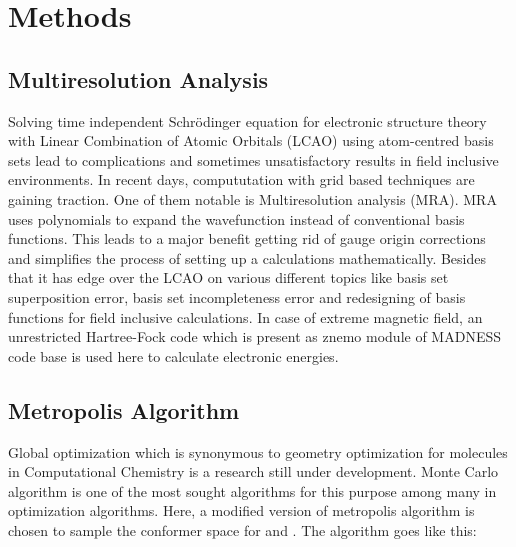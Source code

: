 \section{Methods}

\subsection{Multiresolution Analysis}
Solving time independent Schr\"odinger equation for electronic structure theory with Linear Combination of Atomic Orbitals (LCAO) using atom-centred basis sets lead to complications and sometimes unsatisfactory results in field inclusive environments. In recent days, compututation with grid based techniques are gaining traction. One of them notable is Multiresolution analysis (MRA)\cite{bischoffComputingAccurateMolecular2019}. MRA uses polynomials to expand the wavefunction instead of conventional basis functions. This leads to a major benefit getting rid of gauge origin corrections and simplifies the process of setting up a calculations mathematically. Besides that it has edge over the LCAO on various different topics like basis set superposition error, basis set incompleteness error and redesigning of basis functions for field inclusive calculations. In case of extreme magnetic field, an unrestricted Hartree-Fock code which is present as znemo module of MADNESS code\cite{harrisonMADNESSMultiresolutionAdaptive2016, MadnessMadness2024} base is used here to calculate electronic energies.  

\subsection{Metropolis Algorithm}
Global optimization which is synonymous to geometry optimization for molecules in Computational Chemistry is a research still under development. Monte Carlo algorithm is one of the most sought algorithms for this purpose among many in optimization algorithms. Here, a modified version of metropolis algorithm is chosen to  sample the conformer space for  and . The algorithm goes like this:

